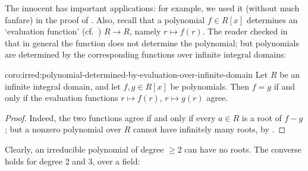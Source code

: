 The innocent  has important applications: for
example, we used it (without much fanfare) in the proof of
. Also, recall that a polynomial $f \in R[x]$
determines an `evaluation function' (cf.\
) $R \to R$, namely
$r \mapsto f(r)$. The reader checked in
 that in general the function does
not determine the polynomial; but polynomials are determined by the
corresponding functions over infinite integral domains:
\begin{coro}{}{coro:irred:polynomial-determined-by-evaluation-over-infinite-domain}
  Let $R$ be an infinite integral domain, and let $f, g \in R[x]$ be
  polynomials. Then $f = g$ if and only if the evaluation functions
  $r \mapsto f(r)$, $r \mapsto g(r)$ agree.
\end{coro}
\begin{proof}
  Indeed, the two functions agree if and only if every $a \in R$ is a
  root of $f - g$; but a nonzero polynomial over $R$ cannot have
  infinitely many roots, by .
\end{proof}
Clearly, an irreducible polynomial of degree $\geq 2$ can have no
roots.  The converse holds for degree 2 and 3, over a field:

